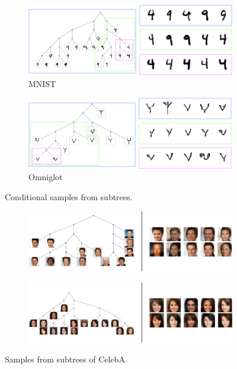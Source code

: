 \begin{figure}[h]
\centering
\begin{subfigure}[t]{0.45\textwidth}
\centering
\includegraphics[width=\textwidth]{img/loracs/mnist/mnist-samples.png}
\caption{MNIST}
\end{subfigure}
\begin{subfigure}[t]{0.45\textwidth}
\centering
\includegraphics[width=\textwidth]{img/loracs/omniglot/omniglot-samples.png}
\caption{Omniglot}
\end{subfigure}
\caption{Conditional samples from subtrees.}
\label{fig:subtree-samples}
\end{figure}


\begin{figure}[h]
\centering
\begin{subfigure}[t]{0.45\textwidth}
\centering
\includegraphics[frame, width=\textwidth]{img/loracs/celeba/celeba-samples-1.png}
\end{subfigure}
\begin{subfigure}[t]{0.45\textwidth}
\centering
\includegraphics[frame, width=\textwidth]{img/loracs/celeba/celeba-samples-2.png}
\end{subfigure}
\caption{Samples from subtrees of CelebA.}
\label{fig:celeba-samples}
\end{figure}


